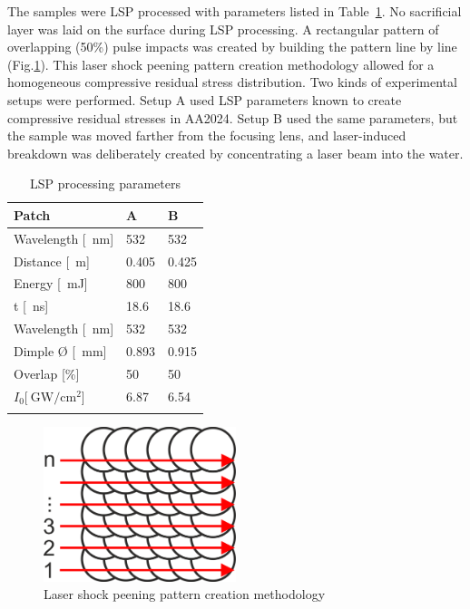 \documentclass[sn-nature]{sn-jnl}%
\theoremstyle{thmstyleone}%
\theoremstyle{thmstyletwo}%
\theoremstyle{thmstylethree}%
\begin{document}
   The samples were LSP processed with parameters listed in Table~\ref{tab:lspparameters}. No sacrificial layer was laid on the surface during LSP processing. A  rectangular pattern of overlapping (50\%) pulse impacts was created by building the pattern line by line (Fig.\ref{fig:pattern_creation}). This laser shock peening pattern creation methodology allowed for a homogeneous compressive residual stress distribution. Two kinds of experimental setups were performed. Setup A used LSP parameters known to create compressive residual stresses in AA2024. Setup B used the same parameters, but the sample was moved farther from the focusing lens, and laser-induced breakdown was deliberately created by concentrating a laser beam into the water.


    \begin{table}[h!]
    \caption{LSP processing parameters}\label{tab:lspparameters}%
    \begin{tabular}{@{}lll@{}}
    \toprule
    Patch & A & B  \\
    \midrule
    Wavelength [\SI{}{\nm}] & 532 & 532    \\
    Distance [\SI{}{\m}] & 0.405 & 0.425    \\
    Energy [\SI{}{\milli\joule}]& 800 & 800    \\
    t [\SI{}{\ns}] & 18.6 & 18.6    \\
    Wavelength [\SI{}{\nm}] & 532 & 532    \\
    Dimple Ø [\SI{}{ \mm}] & 0.893 & 0.915    \\
    Overlap [\%]  & 50 & 50    \\
    \( I_0  [\SI[]{}{\giga\watt/\cm^2} \)]  & 6.87 & 6.54 \\
    \botrule
    \end{tabular}
    \end{table}



    \begin{figure}[h!]     
    \centering
    \includegraphics[width=0.5\textwidth]{pattern_creation.png}
    \caption{Laser shock peening pattern creation methodology}
    \label{fig:pattern_creation}
    \end{figure}
    
\end{document}

